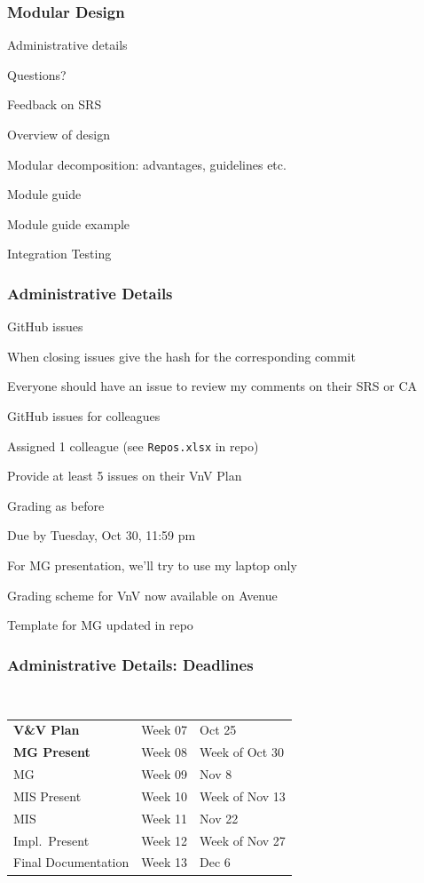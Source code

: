 \documentclass[t,12pt,numbers,fleqn]{beamer}
\begin{document}



\begin{frame}
\frametitle{Modular Design}

\bi
\item Administrative details
\item Questions?
\item Feedback on SRS
\item Overview of design
\item Modular decomposition: advantages, guidelines etc.
\item Module guide
\item Module guide example
\item Integration Testing 
\ei
\end{frame}


\begin{frame}
\frametitle{Administrative Details}

\bi
\item GitHub issues
\bi
\item When closing issues give the hash for the corresponding commit
\item Everyone should have an issue to review my comments on their SRS or CA
\ei
\item GitHub issues for colleagues
\bi
\item Assigned 1 colleague (see \texttt{Repos.xlsx} in repo)
\item Provide at least 5 issues on their VnV Plan
\item Grading as before
\item Due by Tuesday, Oct 30, 11:59 pm
\ei

\item For MG presentation, we'll try to use my laptop only
\item Grading scheme for VnV now available on Avenue
\item Template for MG updated in repo
\ei

\end{frame}


\begin{frame}
\frametitle{Administrative Details: Deadlines}
~\newline
\begin{tabular}{l l l}
\textbf{V\&V Plan} & Week 07 & Oct 25\\
\textbf{MG Present} & Week 08 & Week of Oct 30\\
MG & Week 09 & Nov 8\\
MIS Present & Week 10 & Week of Nov 13\\
MIS & Week 11 & Nov 22\\
Impl.\ Present & Week 12 & Week of Nov 27\\
Final Documentation & Week 13 & Dec 6\\
\end {tabular}

\end{frame}
\end{document}
